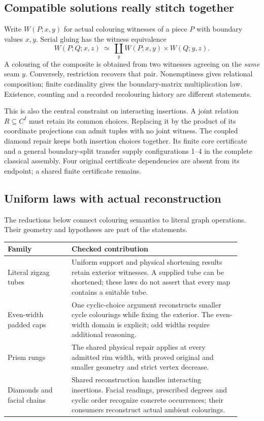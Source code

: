 \subsection{Compatible solutions really stitch together}

Write $W(P;x,y)$ for actual colouring witnesses of a piece $P$ with boundary
values $x,y$. Serial gluing has the witness equivalence
\[
 W(P;Q;x,z)\ \simeq\
       \coprod_y W(P;x,y)\times W(Q;y,z).
\]
A colouring of the composite is obtained from two witnesses agreeing on
the \emph{same} seam $y$. Conversely, restriction recovers that pair.
Nonemptiness gives relational composition; finite cardinality gives the
boundary-matrix multiplication law. Existence, counting and a recorded
recolouring history are different statements.

This is also the central constraint on interacting insertions. A joint
relation $R\subseteq C^I$ must retain its common choices. Replacing it by the
product of its coordinate projections can admit tuples with no joint
witness. The coupled diamond repair keeps both insertion choices together.
Its finite core certificate and a general boundary-split transfer supply
configurations 1--4 in the complete classical assembly. Four original
certificate dependencies are absent from its endpoint; a shared finite
certificate remains.

\subsection{Uniform laws with actual reconstruction}

The reductions below connect colouring semantics to literal graph
operations. Their geometry and hypotheses are part of the statements.
\begin{center}
\small
\begin{tabular}{@{}p{0.25\linewidth}p{0.66\linewidth}@{}}
\toprule
Family & Checked contribution \\
\midrule
Literal zigzag tubes &
Uniform support and physical shortening results retain exterior witnesses.
A supplied tube can be shortened; these laws do not assert that every map
contains a suitable tube. \\
Even-width padded caps &
One cyclic-choice argument reconstructs smaller cycle colourings while
fixing the exterior. The even-width domain is explicit; odd widths require
additional reasoning. \\
Prism rungs &
The shared physical repair applies at every admitted rim width, with
proved original and smaller geometry and strict vertex decrease. \\
Diamonds and facial chains &
Shared reconstruction handles interacting insertions. Facial readings,
prescribed degrees and cyclic order recognize concrete occurrences; their
consumers reconstruct actual ambient colourings. \\
\bottomrule
\end{tabular}
\end{center}

